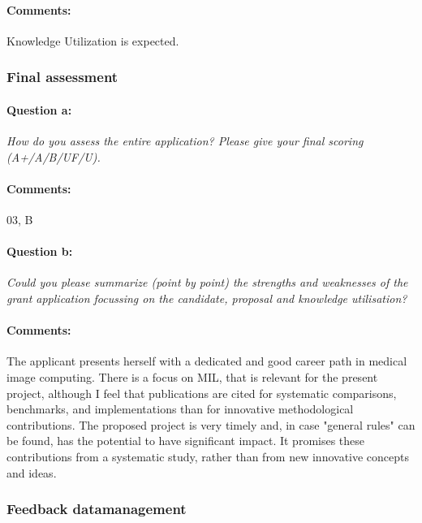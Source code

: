\documentclass[serif, twocolumn, numeric, rga]{jote-article}
\begin{document}
\paragraph{Comments:}

Knowledge Utilization is expected.

 {}\subsubsection*{Final assessment} 

\paragraph{Question a:}
\textit{How do you assess the entire application? Please give your final scoring (A+/A/B/UF/U).}

\paragraph{Comments:}

03, B

\paragraph{Question b:}
\textit{Could you please summarize (point by point) the strengths and weaknesses of the grant application focussing on the candidate, proposal and knowledge utilisation?}
\paragraph{Comments:}
The applicant presents herself with a dedicated and good career path in medical image computing. There is a focus on MIL, that is relevant for the present project, although I feel that publications are cited for systematic comparisons, benchmarks, and implementations than for innovative methodological contributions. The proposed project is very timely and, in case "general rules" can be found, has the potential to have significant impact. It promises these contributions from a systematic study, rather than from new innovative concepts and ideas.

 {}\subsubsection*{Feedback datamanagement} 
\end{document}
